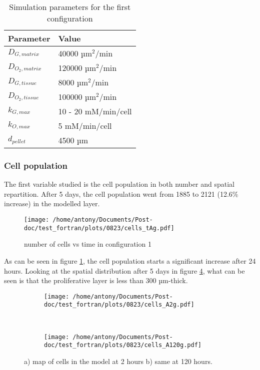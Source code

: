 \documentclass[11pt,a4paper]{article}
\begin{document}
\begin{table}[h!]
\begin{center}
\begin{tabular}{ |p{20mm}|p{45mm}| }
\hline 
\textbf{Parameter} & \textbf{Value}\\
\hline
\hline
$D_{G,matrix}$ & 40000 µm$^2$/min \\
\hline
$D_{O_2,matrix}$ & 120000 µm$^2$/min \\
\hline
$D_{G,tissue}$ & 8000 µm$^2$/min \\
\hline
$D_{O_2,tissue}$ & 100000 µm$^2$/min \\
\hline
$k_{G,max}$ & 10 - 20 mM/min/cell \\
\hline
$k_{O,max}$ & 5 mM/min/cell \\
\hline
$d_{pellet}$ & 4500 µm\\
\hline
\end{tabular}
\caption{Simulation parameters for the first configuration \label{params1}}   
\end{center}
\end{table} 

\subsubsection{Cell population}
The first variable studied is the cell population in both number and spatial repartition. After 5 days, the cell population went from 1885 to 2121 (12.6\% increase) in the modelled layer. \\

\begin{figure}[ht!]
\begin{center}
\texttt{[image: /home/antony/Documents/Post-doc/test\_fortran/plots/0823/cells\_tAg.pdf]}
\caption{number of cells vs time in configuration 1\label{cells_t}}
\end{center}
\end{figure}

As can be seen in figure \ref{cells_t}, the cell population starts a significant increase after 24 hours. Looking at the spatial distribution  after 5 days in figure \ref{cellsA}, what can be seen is that the proliferative layer is less than 300 µm-thick.\\  

\begin{figure}[ht!]
	\begin{subfigure}{0.45\textwidth}
	\centering
	\texttt{[image: /home/antony/Documents/Post-doc/test\_fortran/plots/0823/cells\_A2g.pdf]}
	\caption{ \label{cellsA2}}
	\end{subfigure}
	~~
	\begin{subfigure}{0.45\textwidth}
	\texttt{[image: /home/antony/Documents/Post-doc/test\_fortran/plots/0823/cells\_A120g.pdf]}
		\caption{ \label{cellA120}}
	\end{subfigure}
	\caption{a) map of cells in the model at 2 hours b) same at 120 hours.\label{cellsA}}
	\end{figure}
	
\end{document}
